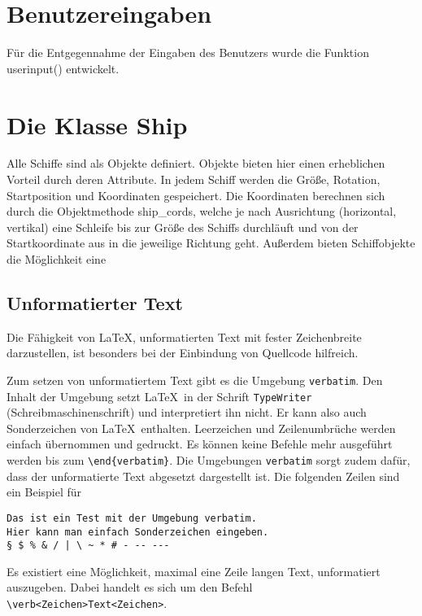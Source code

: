 \documentclass{llncs}
\begin{document}
\section{Benutzereingaben}

Für die Entgegennahme der Eingaben des Benutzers wurde die Funktion \glqq userinput()\grqq{} entwickelt.

\section{Die Klasse Ship}

Alle Schiffe sind als Objekte definiert. Objekte bieten hier einen erheblichen Vorteil durch deren Attribute.
In jedem Schiff werden die Größe, Rotation, Startposition und Koordinaten gespeichert. Die Koordinaten berechnen sich durch die Objektmethode \glqq ship_cords\grqq{},
welche je nach Ausrichtung (horizontal, vertikal) eine Schleife bis zur Größe des Schiffs durchläuft und von der Startkoordinate aus in die jeweilige Richtung geht.
Außerdem bieten Schiffobjekte die Möglichkeit eine 

\subsection{Unformatierter Text}
Die Fähigkeit von \LaTeX, unformatierten Text mit fester Zeichenbreite darzustellen, ist 
besonders bei der Einbindung von Quellcode hilfreich.

Zum setzen von unformatiertem Text gibt es die Umgebung \texttt{verbatim}. Den Inhalt der Umgebung setzt \LaTeX\ in der Schrift \texttt{TypeWriter} (Schreibmaschinenschrift) und interpretiert ihn nicht. Er kann also auch Sonderzeichen von \LaTeX\ enthalten. Leerzeichen und Zeilenumbrüche werden einfach übernommen und gedruckt. Es können keine Befehle mehr ausgeführt werden bis zum \verb!\end{verbatim}!. Die Umgebungen \texttt{verbatim} sorgt zudem dafür, dass der unformatierte Text abgesetzt dargestellt ist. Die folgenden Zeilen sind ein Beispiel für 

\begin{verbatim}
Das ist ein Test mit der Umgebung verbatim.
Hier kann man einfach Sonderzeichen eingeben.
§ $ % & / | \ ~ * # - -- ---
\end{verbatim}

Es existiert eine Möglichkeit, maximal eine Zeile langen Text, unformatiert auszugeben. Dabei handelt es sich um den Befehl \verb!\verb<Zeichen>Text<Zeichen>!.
\end{document}
